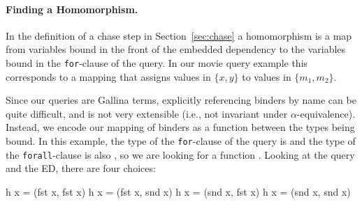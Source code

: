 \documentclass[preprint]{sigplanconf}
\begin{document}
\paragraph{Finding a Homomorphism.}
In the definition of a chase step in Section~\ref{sec:chase} a homomorphism is a map from variables bound in the front of the embedded dependency to the variables bound in the {\tt for}-clause of the query.
In our movie query example this corresponds to a mapping that assigns values in $\{x,y\}$ to values in $\{m_1,m_2\}$.

Since our queries are Gallina terms, explicitly referencing binders by name can be quite difficult, and is not very extensible (i.e., not invariant under $\alpha$-equivalence).
Instead, we encode our mapping of binders as a function between the types being bound.
In this example, the type of the {\tt for}-clause of the query is  and the type of the {\tt forall}-clause is also , so we are looking for a function .
Looking at the query and the ED, there are four choices:
\begin{coq}
h x = (fst x, fst x)
h x = (fst x, snd x)
h x = (snd x, fst x)
h x = (snd x, snd x)
\end{coq}
\end{document}
